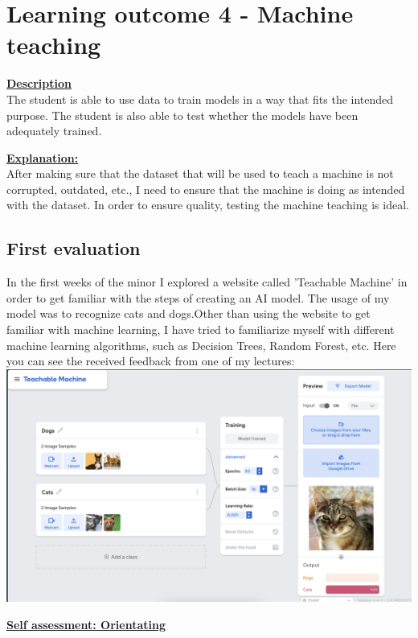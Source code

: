 \documentclass{article}
\begin{document}
	\section{Learning outcome 4 - Machine teaching}
	\underline{\textbf{Description}}\\
	The student is able to use data to train models in a way that fits the intended purpose.
	The student is also able to test whether the models have been adequately trained.
	
	\underline{\textbf{Explanation:}}\\
	After making sure that the dataset that will be used to teach a machine is not corrupted, outdated, etc., 
	I need to ensure that the machine is doing as intended with the dataset. In order to ensure quality, testing the
	machine teaching is ideal.
	
	\subsection{First evaluation}
	In the first weeks of the minor I explored a website called 'Teachable Machine' in order to get familiar with the steps of creating an 
	AI model. The usage of my model was to recognize cats and dogs.Other than using the website to get familiar with machine learning, 
  I have tried to familiarize myself with different machine learning algorithms, such as Decision Trees, Random Forest, etc. Here you can see the received feedback from one
  of my lectures:\\
  \includegraphics[width=\textwidth,keepaspectratio]{images/FeedbackTeachableMachines.png}

  \underline{\textbf{Self assessment: Orientating}}
\newpage
\end{document}
